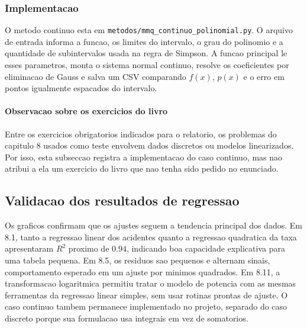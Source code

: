 \documentclass[../main.tex]{subfiles}
\begin{document}
\subsubsection{Implementacao}

O metodo continuo esta em \texttt{metodos/mmq\_continuo\_polinomial.py}. O
arquivo de entrada informa a funcao, os limites do intervalo, o grau do
polinomio e a quantidade de subintervalos usada na regra de Simpson. A funcao
principal le esses parametros, monta o sistema normal continuo, resolve os
coeficientes por eliminacao de Gauss e salva um CSV comparando \(f(x)\),
\(p(x)\) e o erro em pontos igualmente espacados do intervalo.

\paragraph{Observacao sobre os exercicios do livro}
Entre os exercicios obrigatorios indicados para o relatorio, os problemas do
capitulo 8 usados como teste envolvem dados discretos ou modelos linearizados.
Por isso, esta subseccao registra a implementacao do caso continuo, mas nao
atribui a ela um exercicio do livro que nao tenha sido pedido no enunciado.

\subsection{Validacao dos resultados de regressao}

Os graficos confirmam que os ajustes seguem a tendencia principal dos dados. Em
8.1, tanto a regressao linear dos acidentes quanto a regressao quadratica da
taxa apresentaram \(R^2\) proximo de \(0.94\), indicando boa capacidade
explicativa para uma tabela pequena. Em 8.5, os residuos sao pequenos e
alternam sinais, comportamento esperado em um ajuste por minimos quadrados. Em
8.11, a transformacao logaritmica permitiu tratar o modelo de potencia com as
mesmas ferramentas da regressao linear simples, sem usar rotinas prontas de
ajuste. O caso continuo tambem permanece implementado no projeto, separado do
caso discreto porque sua formulacao usa integrais em vez de somatorios.
\end{document}
